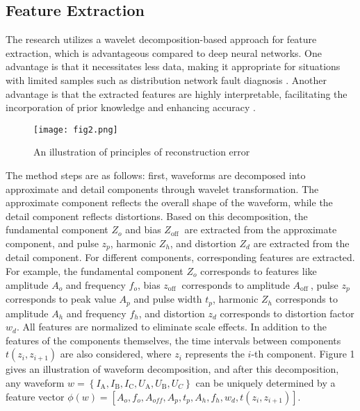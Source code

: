 \documentclass[conference]{IEEEtran}
\begin{document}
\subsection{Feature Extraction}

The research utilizes a wavelet decomposition-based approach for feature extraction, which is advantageous compared to deep neural networks. One advantage is that it necessitates less data, making it appropriate for situations with limited samples such as distribution network fault diagnosis \cite{li2020fault}. Another advantage is that the extracted features are highly interpretable, facilitating the incorporation of prior knowledge and enhancing accuracy \cite{xie2016development}.

\begin{figure}[htbp]
\centerline{\texttt{[image: fig2.png]}}
\caption{An illustration of principles of reconstruction error}
\label{fig}
\end{figure}


The method steps are as follows: first, waveforms are decomposed into approximate and detail components through wavelet transformation. The approximate component reflects the overall shape of the waveform, while the detail component reflects distortions. Based on this decomposition, the fundamental component $Z_{o}$ and bias $Z_{\text {off }}$ are extracted from the approximate component, and pulse $z_{p}$, harmonic $Z_{h}$, and distortion $Z_{d}$ are extracted from the detail component. For different components, corresponding features are extracted. For example, the fundamental component $Z_{o}$ corresponds to features like amplitude $A_{o}$ and frequency $f_{o}$, bias $z_{\text {off }}$ corresponds to amplitude $A_{\text {off }}$, pulse $z_{p}$ corresponds to peak value $A_{p}$ and pulse width $t_{p}$, harmonic $Z_{h}$ corresponds to amplitude $A_{h}$ and frequency $f_{h}$, and distortion $z_{d}$ corresponds to distortion factor $w_{d}$. All features are normalized to eliminate scale effects. In addition to the features of the components themselves, the time intervals between components $t\left(z_{i}, z_{i+1}\right)$ are also considered, where $z_{i}$ represents the $i$-th component. Figure 1 gives an illustration of waveform decomposition, and after this decomposition, any waveform $w=\left\{I_{\mathrm{A}}, I_{\mathrm{B}}, I_{\mathrm{C}}, U_{\mathrm{A}}, U_{\mathrm{B}}, U_{C}\right\}$ can be uniquely determined by a feature vector $\phi(w)=\left[A_{o}, f_{o}, A_{o f f}, A_{p}, t_{p}, A_{h}, f_{h}, w_{d}, t\left(z_{i}, z_{i+1}\right)\right]$.
\end{document}
